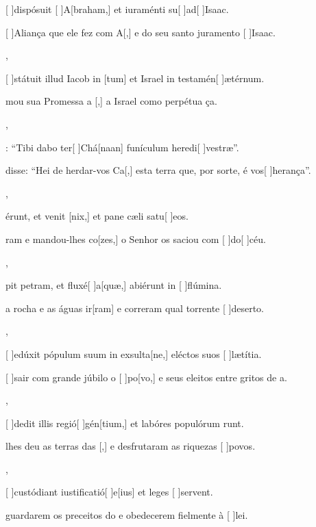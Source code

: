 {  {\item {}[ ]{dis}pósuit [ ]{A}[braham,] et iuraménti su[ ]{ad}[ ]{I}saac.~\Antiphona}%
    {\item {}[ ]{A}liança que ele fez com A[,] e do seu santo juramento [ ]{I}{sa}ac.~\Antiphona},
  {\item {}[ ]{stá}tuit illud Iacob in [tum] et Israel in testamén[ ]{æ}{tér}num.~\Antiphona}%
    {\item {}mou sua Promessa a [,] a Israel como perpétua ça.~\Antiphona},
  {\item {}: ``Tibi dabo ter[ ]{Chá}[naan] funículum heredi[ ]{ve}stræ''.~\Antiphona}%
    {\item {} disse: ``Hei de herdar-vos Ca[,] esta terra que, por sorte, é vos[ ]{he}{ran}ça''.~\Antiphona},
  {\item {}érunt, et venit [nix,] et pane cæli satu[ ]{e}os.~\Antiphona}%
    {\item {}ram e mandou-lhes co[zes,] o Senhor os saciou com [ ]{do}[ ]{céu}.~\Antiphona},
  {\item {}pit petram, et fluxé[ ]{a}[quæ,] abiérunt in [ ]{flú}mina.~\Antiphona}%
    {\item {} a rocha e as águas ir[ram] e correram qual torrente [ ]{de}{ser}to.~\Antiphona},
  {\item {}[ ]{e}dúxit pópulum suum in exsulta[ne,] eléctos suos [ ]{læ}{tí}tia.~\Antiphona}%
    {\item {}[ ]{sa}ir com grande júbilo o [ ]{po}[vo,] e seus eleitos entre gritos de a.~\Antiphona},
  {\item {}[ ]{de}dit illis regió[ ]{gén}[tium,] et labóres populórum runt.~\Antiphona}%
    {\item {} lhes deu as terras das [,] e desfrutaram as riquezas [ ]{po}vos.~\Antiphona},
  {\item {}[ ]{cu}stódiant iustificatió[ ]{e}[ius] et leges [ ]{ser}\-vent.~\Antiphona}%
    {\item {} guardarem os preceitos do  e obedecerem fielmente à [ ]{lei}.~\Antiphona}
}